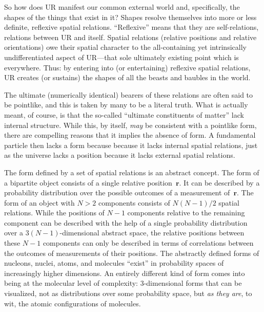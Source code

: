 \documentclass[12pt]{article}
\begin{document}
So how does UR manifest our common external world and, specifically, the {shapes} of the things that exist in it? Shapes resolve themselves into more or less definite, reflexive spatial relations. ``Reflexive'' means that they are self-relations, relations between UR and itself. Spatial relations (relative positions and relative orientations) owe their spatial character to the all-containing yet intrinsically undifferentiated aspect of UR---that sole ultimately existing point which is everywhere. Thus: by entering into (or entertaining) reflexive spatial relations, UR creates (or sustains) the shapes of all the beasts and baubles in the world.

The ultimate (numerically identical) bearers of these relations are often said to be pointlike, and this is taken by many to be a literal truth. What is actually meant, of course, is that the so-called ``ultimate constituents of matter'' lack internal structure. While this, by itself, \emph{may} be consistent with a pointlike form, there are compelling reasons that it implies the absence of form. A fundamental particle then lacks a form because because it lacks internal spatial relations, just as the universe lacks a position because it lacks external spatial relations.

The form defined by a set of spatial relations is an abstract concept. The form of a bipartite object consists of a single relative position~$\mathbf r$. It can be described by a probability distribution over the possible outcomes of a measurement of~$\mathbf r$. The form of an object with $N>2$ components consists of $N(N{-}1)/2$ spatial relations. While the positions of $N{-}1$ components relative to the remaining component can be described with the help of a single probability distribution over a $3(N{-}1)$-dimensional abstract space, the relative positions between these $N{-}1$ components can only be described in terms of correlations between the outcomes of measurements of their positions. The abstractly defined forms of nucleons, nuclei, atoms, and molecules ``exist'' in probability spaces of increasingly higher dimensions. An entirely different kind of form comes into being at the molecular level of complexity: 3-dimensional forms that can be visualized, not as distributions over some probability space, but \emph{as they are}, to wit, the atomic configurations of molecules.
\end{document}
